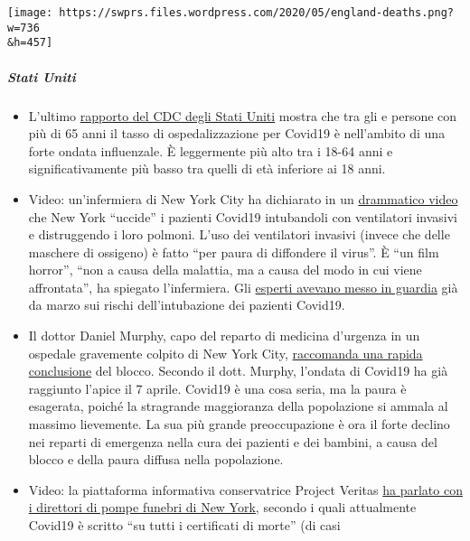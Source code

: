 \texttt{[image: https://swprs.files.wordpress.com/2020/05/england-deaths.png?w=736\\\&h=457]}

\hypertarget{stati-uniti}{%
\subparagraph{\texorpdfstring{\textbf{Stati
Uniti}}{Stati Uniti}}\label{stati-uniti}}

\begin{itemize}
\tightlist
\item
  L'ultimo
  \href{https://www.cdc.gov/coronavirus/2019-ncov/covid-data/covidview/index.html}{rapporto
  del CDC degli Stati Uniti} mostra che tra gli e persone con più di 65
  anni il tasso di ospedalizzazione per Covid19 è nell'ambito di una
  forte ondata influenzale. È leggermente più alto tra i 18-64 anni e
  significativamente più basso tra quelli di età inferiore ai 18 anni.
\item
  Video: un'infermiera di New York City ha dichiarato in un
  \href{https://www.dailymail.co.uk/news/article-8262351/Nurse-New-York-claims-city-killing-COVID-19-patients-putting-ventilators.html}{drammatico
  video} che New York ``uccide'' i pazienti Covid19 intubandoli con
  ventilatori invasivi e distruggendo i loro polmoni. L'uso dei
  ventilatori invasivi (invece che delle maschere di ossigeno) è fatto
  ``per paura di diffondere il virus''. È ``un film horror'', ``non a
  causa della malattia, ma a causa del modo in cui viene affrontata'',
  ha spiegato l'infermiera. Gli
  \href{https://off-guardian.org/2020/05/06/covid19-are-ventilators-killing-people/}{esperti
  avevano messo in guardia} già da marzo sui rischi dell'intubazione dei
  pazienti Covid19.
\item
  Il dottor Daniel Murphy, capo del reparto di medicina d'urgenza in un
  ospedale gravemente colpito di New York City,
  \href{https://nypost.com/2020/04/27/ive-worked-the-coronavirus-front-line-and-i-say-its-time-to-start-opening-up/}{raccomanda
  una rapida conclusione} del blocco. Secondo il dott. Murphy, l'ondata
  di Covid19 ha già raggiunto l'apice il 7 aprile. Covid19 è una cosa
  seria, ma la paura è esagerata, poiché la stragrande maggioranza della
  popolazione si ammala al massimo lievemente. La sua più grande
  preoccupazione è ora il forte declino nei reparti di emergenza nella
  cura dei pazienti e dei bambini, a causa del blocco e della paura
  diffusa nella popolazione.
\item
  Video: la piattaforma informativa conservatrice Project Veritas
  \href{https://www.youtube.com/watch?v=g5f_6ltv7oI}{ha parlato con i
  direttori di pompe funebri di New York}, secondo i quali attualmente
  Covid19 è scritto ``su tutti i certificati di morte'' (di casi

\end{itemize}
